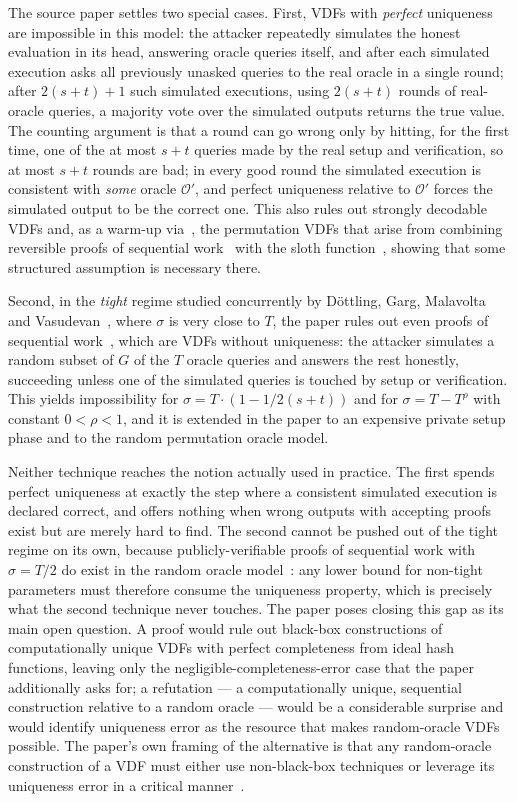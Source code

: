\documentclass{aicr-conjecture}
\newcommand{\RO}{\mathcal{O}}
\begin{document}
The source paper settles two special cases. First, VDFs with \emph{perfect}
uniqueness are impossible in this model: the attacker repeatedly simulates
the honest evaluation in its head, answering oracle queries itself, and
after each simulated execution asks all previously unasked queries to the
real oracle in a single round; after $2(s+t)+1$ such simulated executions,
using $2(s+t)$ rounds of real-oracle queries, a majority vote over the
simulated outputs returns the true value. The counting argument is that a
round can go wrong only by hitting, for the first time, one of the at most
$s+t$ queries made by the real setup and verification, so at most $s+t$
rounds are bad; in every good round the simulated execution is consistent
with \emph{some} oracle $\RO'$, and perfect uniqueness relative to $\RO'$
forces the simulated output to be the correct one. This also rules out
strongly decodable VDFs and, as a warm-up via~\cite{MMV11}, the permutation
VDFs that arise from combining reversible proofs of sequential
work~\cite{AKK19} with the sloth function~\cite{LW15}, showing that some
structured assumption is necessary there.

Second, in the \emph{tight} regime studied concurrently by D\"ottling,
Garg, Malavolta and Vasudevan~\cite{DGMV19}, where $\sigma$ is very close
to $T$, the paper rules out even proofs of sequential
work~\cite{MMV13,CP18}, which are VDFs without uniqueness: the attacker
simulates a random subset of $G$ of the $T$ oracle queries and answers the
rest honestly, succeeding unless one of the simulated queries is touched by
setup or verification. This yields impossibility for
$\sigma = T \cdot (1 - 1/2(s+t))$ and for $\sigma = T - T^{\rho}$ with
constant $0 < \rho < 1$, and it is extended in the paper to an expensive
private setup phase and to the random permutation oracle model.

Neither technique reaches the notion actually used in practice. The first
spends perfect uniqueness at exactly the step where a consistent simulated
execution is declared correct, and offers nothing when wrong outputs with
accepting proofs exist but are merely hard to find. The second cannot be
pushed out of the tight regime on its own, because publicly-verifiable
proofs of sequential work with $\sigma = T/2$ do exist in the random oracle
model~\cite{MMV13}: any lower bound for non-tight parameters must therefore
consume the uniqueness property, which is precisely what the second
technique never touches. The paper poses closing this gap as its main open
question. A proof would rule out black-box constructions of computationally
unique VDFs with perfect completeness from ideal hash functions, leaving
only the negligible-completeness-error case that the paper additionally
asks for; a refutation --- a computationally unique, sequential
construction relative to a random oracle --- would be a considerable
surprise and would identify uniqueness error as the resource that makes
random-oracle VDFs possible. The paper's own framing of the alternative is
that any random-oracle construction of a VDF must either use non-black-box
techniques or leverage its uniqueness error in a critical
manner~\cite{MSW20}.
\end{document}
